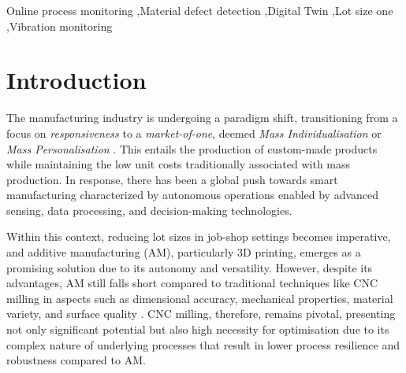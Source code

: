 \documentclass[5p,times,procedia]{elsarticle}
\begin{document}
\begin{frontmatter}
\begin{keyword}
 Online process monitoring \sep Material defect detection \sep Digital Twin \sep Lot size one \sep Vibration monitoring





\end{keyword}

\end{frontmatter}


\section{Introduction}\label{Sec_Introduction}


The manufacturing industry is undergoing a paradigm shift, transitioning from a focus on \textit{responsiveness} to a \textit{market-of-one}, deemed \textit{Mass Individualisation} \cite{Lu.Xu.ea2020} or \textit{Mass Personalisation} \cite{Qin.Lu2021}. This entails the production of custom-made products while maintaining the low unit costs traditionally associated with mass production.
In response, there has been a global push towards smart manufacturing characterized by autonomous operations enabled by advanced sensing, data processing, and decision-making technologies. \cite{Gu.Koren2022, Lu.Morris.ea2016}


Within this context, reducing lot sizes in job-shop settings becomes imperative, and additive manufacturing (AM), particularly 3D printing, emerges as a promising solution due to its autonomy and versatility.
However, despite its advantages, AM still falls short compared to traditional techniques like CNC milling in aspects such as dimensional accuracy, mechanical properties, material variety, and surface quality \cite{Chen.Lin2017,zotero-232,zotero-236}.
CNC milling, therefore, remains pivotal, presenting not only significant potential but also high necessity for optimisation due to its complex nature of underlying processes that result in lower process resilience and robustness compared to AM.
\end{document}
